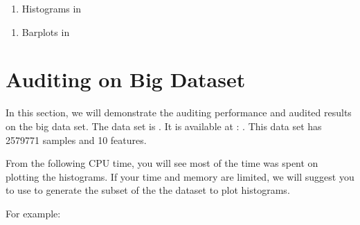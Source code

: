 \documentclass[letterpaper,12pt,english]{sphinxmanual}
\begin{document}
\begin{enumerate}
\def\theenumi{\arabic{enumi}}
\def\labelenumi{\theenumi .}
\makeatletter\def\p@enumii{\p@enumi \theenumi .}\makeatother
\setcounter{enumi}{4}
\item {} 
Histograms in 

\end{enumerate}
\begin{quote}

\begin{figure}[htbp]
\centering

\noindent{}
\end{figure}
\end{quote}
\begin{enumerate}
\def\theenumi{\arabic{enumi}}
\def\labelenumi{\theenumi .}
\makeatletter\def\p@enumii{\p@enumi \theenumi .}\makeatother
\setcounter{enumi}{5}
\item {} 
Barplots in 

\end{enumerate}
\begin{quote}

\begin{figure}[htbp]
\centering

\noindent{}
\end{figure}
\end{quote}


\section{Auditing on Big Dataset}
\label{\detokenize{demo:auditing-on-big-dataset}}
In this section, we will demonstrate the auditing performance and audited results on the big data set.
The data set is .  It is available at :
. This data set has 2579771
samples and 10 features.

From the following CPU time, you will see most
of the time was spent on plotting the histograms. If your time and memory are limited, we will suggest
you to use  to generate the subset of the the dataset to plot histograms.

For example:
\end{document}
